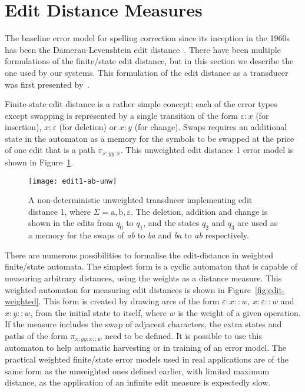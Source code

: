 \documentclass[officiallayout,final]{unihelcompling}
\begin{document}
\section{Edit Distance Measures}
\label{sec:edit-distance}

The baseline error model for spelling correction since its inception in the
1960s has been the Damerau-Levenshtein edit
distance~\citep{damerau1964technique,levenshtein1966binary}. There have been
multiple formulations of the finite\-/state edit distance, but in this section
we describe the one used by our systems. This formulation of the edit distance
as a transducer was first presented by~\citet{schulz2002fast}.

Finite-state edit distance is a rather simple concept; each of the error types
except swapping is represented by a single transition of the form $\varepsilon:x$ (for
insertion), $x:\varepsilon$ (for deletion) or $x:y$ (for change). Swaps
requires an additional state in the automaton as a memory for the symbols to be
swapped at the price of one edit that is a path $\pi_{x:y y:x}$. This
unweighted edit distance 1 error model is shown in Figure~\ref{fig:edit1-ab}.

\begin{figure}
    \texttt{[image: edit1-ab-unw]}
    \caption{A non-deterministic unweighted transducer implementing edit
        distance 1, where $\Sigma = {\mathrm{a}, \mathrm{b}, \varepsilon}$.  The
        deletion, addition and change is shown in the edits from $q_0$ to
        $q_1$, and the states $q_2$ and $q_3$ are used as a memory for the
    swaps of \emph{ab} to \emph{ba} and \emph{ba} to \emph{ab} respectively.
\label{fig:edit1-ab}}
\end{figure}

There are numerous possibilities to formalise the edit-distance in weighted
finite\-/state automata. The simplest form is a cyclic automaton that is
capable of measuring arbitrary distances, using the weights as a distance
measure. This weighted automaton for measuring edit distances is shown in
Figure~\ref{fig:edit-weighted}. This form is created by drawing arcs of the
form $\varepsilon:x::w$, $x:\varepsilon::w$ and $x:y::w$, from the initial
state to itself, where $w$ is the weight of a given operation. If the measure
includes the swap of adjacent characters, the extra states and paths of the
form $\pi_{x:y y:x::w}$ need to be defined. It is possible to use this
automaton to help automatic harvesting or in training of an error model. The
practical weighted finite\-/state error models used in real applications are of
the same form as the unweighted ones defined earlier, with limited maximum
distance, as the application of an infinite edit measure is expectedly slow.
\end{document}
